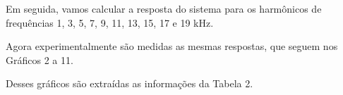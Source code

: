 
Em seguida, vamos calcular a resposta do sistema para os harmônicos de frequências 1, 3, 5, 7, 9, 11, 13, 15, 17 e 19 kHz.


Agora experimentalmente são medidas as mesmas respostas, que seguem nos Gráficos 2 a 11. 



Desses gráficos são extraídas as informações da Tabela 2.
\newpage

